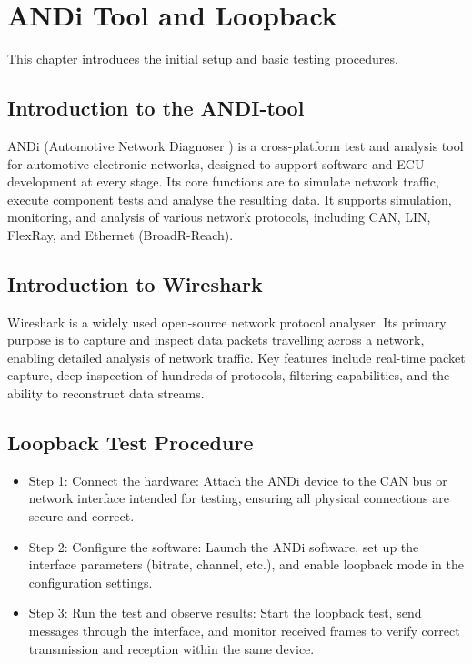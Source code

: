 \section{ANDi Tool and Loopback}
\label{sec:andi-tool}

This chapter introduces the initial setup and basic testing procedures.

\subsection{Introduction to the ANDI-tool}
ANDi (Automotive Network Diagnoser ) is a cross-platform test and analysis tool for automotive electronic networks, designed to support software and ECU development at every stage. Its core functions are to simulate network traffic, execute component tests and analyse the resulting data\cite{technica}. It supports simulation, monitoring, and analysis of various network protocols, including CAN, LIN, FlexRay, and Ethernet (BroadR-Reach).
   
\subsection{Introduction to Wireshark}
Wireshark is a widely used open-source network protocol analyser. Its primary purpose is to capture and inspect data packets travelling across a network, enabling detailed analysis of network traffic. Key features include real-time packet capture, deep inspection of hundreds of protocols, filtering capabilities, and the ability to reconstruct data streams. 
   
\subsection{Loopback Test Procedure}
\begin{itemize}
    \item Step 1: Connect the hardware: Attach the ANDi device to the CAN bus or network interface intended for testing, ensuring all physical connections are secure and correct. 
    \item Step 2: Configure the software: Launch the ANDi software, set up the interface parameters (bitrate, channel, etc.), and enable loopback mode in the configuration settings. 
    \item Step 3: Run the test and observe results: Start the loopback test, send messages through the interface, and monitor received frames to verify correct transmission and reception within the same device. 
\end{itemize}

